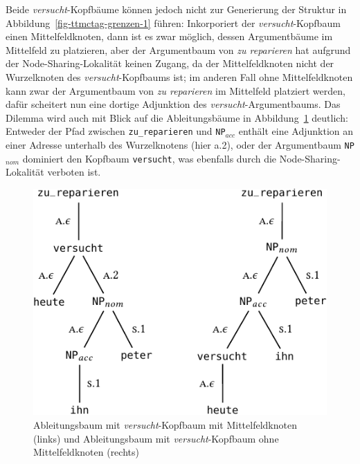 Beide {\it versucht}-Kopfbäume können jedoch nicht zur Generierung der Struktur in Abbildung~\ref{fig-ttmctag-grenzen-1} führen: Inkorporiert der {\it versucht}-Kopfbaum einen Mittelfeldknoten, dann ist es zwar möglich, dessen Argumentbäume im Mittelfeld zu platzieren, aber der Argumentbaum von {\it zu reparieren} hat aufgrund der Node-Sharing-Lokalität keinen Zugang, da der Mittelfeldknoten nicht der Wurzelknoten des {\it versucht}-Kopfbaums ist; im anderen Fall ohne Mittelfeldknoten kann zwar der Argumentbaum von {\it zu reparieren} im Mittelfeld platziert werden, dafür scheitert nun eine dortige Adjunktion des {\it versucht}-Argumentbaums. Das Dilemma wird auch mit Blick auf die Ableitungsbäume in Abbildung~\ref{fig-ttmctag-grenzen-2-b} deutlich: Entweder der Pfad zwischen {\tt zu\_reparieren} und {\tt NP$_{acc}$} enthält eine Adjunktion an einer Adresse unterhalb des Wurzelknotens (hier {\sc a.2}), oder der Argumentbaum {\tt NP$_{nom}$} dominiert den Kopfbaum {\tt versucht}, was ebenfalls durch die Node-Sharing-Lokalität verboten ist. 
\begin{figure}[t]
\centering
\includegraphics{graphics/abb729.pdf}
\caption{\label{fig-ttmctag-grenzen-2-b}Ableitungsbaum mit {\it versucht}-Kopfbaum mit Mittelfeldknoten (links) und Ableitungsbaum mit {\it versucht}-Kopfbaum ohne Mittelfeldknoten (rechts)}
\end{figure} 

